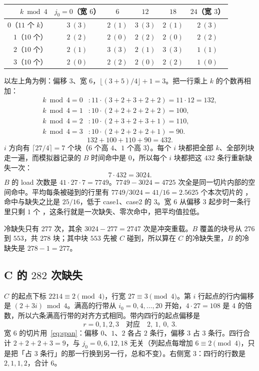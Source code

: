 \begin{center}
\label{tab:blines}
\small
\begin{tabular}{@{}rccccc@{}}
\toprule
$k\bmod 4$ & $j_0=0$（宽 $6$） & $6$ & $12$ & $18$ & $24$（宽 $3$）\\
\midrule
$0$（$11$ 个 $k$） & $3\ (3)$ & $2\ (1)$ & $3\ (3)$ & $2\ (1)$ & $2\ (3)$\\
$1$（$10$ 个） & $2\ (2)$ & $2\ (0)$ & $2\ (2)$ & $2\ (0)$ & $2\ (2)$\\
$2$（$10$ 个） & $2\ (1)$ & $3\ (3)$ & $2\ (1)$ & $3\ (3)$ & $1\ (1)$\\
$3$（$10$ 个） & $2\ (0)$ & $2\ (2)$ & $2\ (0)$ & $2\ (2)$ & $1\ (0)$\\
\bottomrule
\end{tabular}
\end{center}

以左上角为例：偏移 $3$、宽 $6$，$\lfloor(3+5)/4\rfloor+1=3$。把一行乘上 $k$ 的个数再相加：
\begin{align*}
k\bmod 4=0&: 11\cdot(3+2+3+2+2)=11\cdot12=132,\\
k\bmod 4=1&: 10\cdot(2+2+2+2+2)=100,\\
k\bmod 4=2&: 10\cdot(2+3+2+3+1)=110,\\
k\bmod 4=3&: 10\cdot(2+2+2+2+1)=90.
\end{align*}
\[
132+100+110+90=432.
\]
$i$ 方向有 $\lceil27/4\rceil=7$ 个块（$6$ 个高 $4$、$1$ 个高 $3$）。每个 $i$ 块都把全部 $k$、全部列块走一遍，而模拟器记录的 $B$ 时间命中是 $0$，所以每个 $i$ 块都把这 $432$ 条行重新缺失一次：
\[
7\cdot432=3024.
\]
$B$ 的 load 次数是 $41\cdot27\cdot7=7749$。$7749-3024=4725$ 次全是同一切片内部的空间命中。平均每条被碰到的行里有 $7749/3024=41/16=2.5625$ 个本次切片的 ，命中与缺失之比是 $25/16$，低于 case1、case2 的 $3$。宽 $6$ 从偏移 $3$ 起步时一条行里只剩 $1$ 个 ，这条行就是一次缺失、零次命中，把平均值拉低。

冷缺失只有 $277$ 次，其余 $3024-277=2747$ 次是冲突重载。$B$ 覆盖的块号从 $276$ 到 $553$，共 $278$ 块；其中块 $553$ 先被 $C$ 碰到，所以算在 $C$ 的冷缺失里，$B$ 的冷缺失是 $278-1=277$。

\subsection{C 的 \texorpdfstring{$282$}{282} 次缺失}

$C$ 的起点下标 $2214\equiv 2\pmod 4$，行宽 $27\equiv 3\pmod 4$。第 $i$ 行起点的行内偏移是 $(2+3i)\bmod 4$。满高的行带从 $i_0=0,4,\ldots,20$ 开始，$4\cdot27=108$ 是 $4$ 的倍数，所以六条满高行带的对齐方式相同。带内四行的起点偏移是
\[
r=0,1,2,3 \quad\text{对应}\quad 2,\ 1,\ 0,\ 3.
\]
宽 $6$ 的切片用~\eqref{eq:span}：偏移 $0$、$1$、$2$ 各占 $2$ 条行，偏移 $3$ 占 $3$ 条行。四行合计 $2+2+2+3=9$，与 $j_0=0,6,12,18$ 无关（列起点每增加 $6\equiv 2\pmod 4$，只是把「占 $3$ 条行」的那一行换到另一行，总和不变）。右侧宽 $3$：四行的行数是 $2,1,1,2$，合计 $6$。

